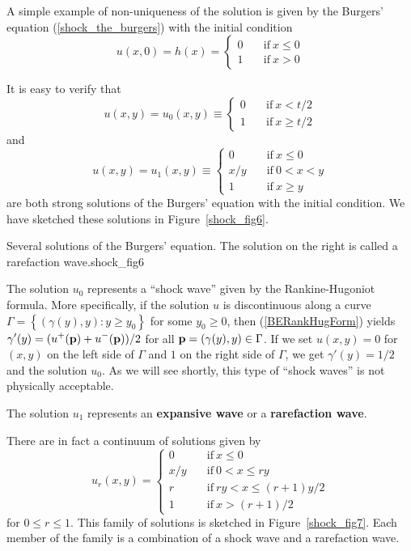\begin{egg}
A simple example of non-uniqueness of the solution is given by the
\label{egg_burgers_nu}
Burgers' equation (\ref{shock_the_burgers}) with the initial condition
\[
u(x,0) = h(x) = \begin{cases}
0 & \quad \text{if}\ x \leq 0 \\
1 & \quad \text{if}\ x > 0
\end{cases}
\]

It is easy to verify that
\[
u(x,y) = u_0(x,y) \equiv \begin{cases} 0 & \quad \text{if} \ x < t/2 \\
1 & \quad \text{if} \ x \geq t/2
\end{cases}
\]
and
\[
u(x,y) = u_1(x,y) \equiv \begin{cases} 0 & \quad \text{if} \ x \leq 0 \\
x/y & \quad \text{if} \ 0 < x < y \\
1 & \quad \text{if} \ x \geq y  
\end{cases}
\]
are both strong solutions of the Burgers' equation with the initial condition.
We have sketched these solutions in Figure~\ref{shock_fig6}.

{Several solutions of the Burgers' equation.  The solution on the
right is called a rarefaction wave.}{shock_fig6}

The solution $u_0$ represents a ``shock wave'' given by the
Rankine-Hugoniot formula.
More specifically, if the solution $u$ is discontinuous along a curve
$\Gamma = \left\{ (\gamma(y),y) : y \geq y_0 \right\}$ for some
$y_0 \geq 0$, then (\ref{BERankHugForm}) yields
$\displaystyle \gamma'(y) = (u^+(\mathbf{p})+u^-(\mathbf{p}))/2$
for all $\mathbf{p}=(\gamma(y),y) \in \Gamma$.  If we set $u(x,y) = 0$
for $(x,y)$ on the left side of $\Gamma$ and $1$ on the right side
of $\Gamma$, we get $\displaystyle \gamma'(y) = 1/2$ and the solution
$u_0$.  As we will see shortly, this type of ``shock waves'' is not
physically acceptable.

The solution $u_1$ represents an
{\bfseries expansive wave} or a
{\bfseries rarefaction wave}.

There are in fact a continuum of solutions given by
\[
u_r(x,y) = \begin{cases}
0 & \quad \text{if} \ x \leq 0 \\
x/y & \quad \text{if} \ 0 < x \leq ry \\
r & \quad \text{if} \ ry < x \leq (r+1)y/2 \\
1 & \quad \text{if} \ x > (r+1)/2 
\end{cases}
\]
for $0 \leq r \leq 1$.  This family of solutions is sketched in
Figure~\ref{shock_fig7}.  Each member of the family is a combination
of a shock wave and a rarefaction wave.
\end{egg}

